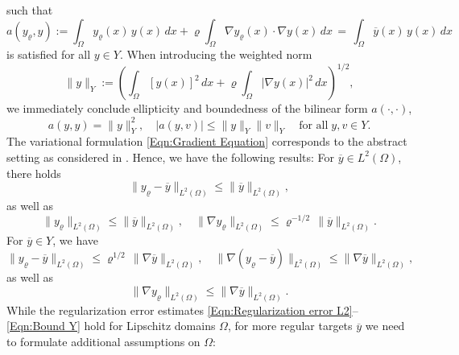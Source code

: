 \documentclass{article}
\numberwithin{equation}{section}
\begin{document}
such that
\begin{equation}\label{Eqn:Gradient Equation}
  a(y_\varrho,y) := \int_\Omega y_\varrho(x) \, y(x) \, dx +
  \varrho \int_\Omega \nabla y_\varrho(x) \cdot \nabla y(x) \, dx
  \, = \,
  \int_\Omega \overline{y}(x) \, y(x) \, dx
\end{equation}
is satisfied for all $y \in Y$. When introducing the weighted norm
\[
  \| y \|_Y := \left( \int_\Omega [y(x)]^2 \, dx + \varrho \int_\Omega 
    |\nabla y(x)|^2 \, dx \right)^{1/2},
\]
we immediately conclude ellipticity and boundedness of the bilinear form
$a(\cdot,\cdot)$,
\begin{equation}\label{Eqn:Properties A}
  a(y,y) = \| y \|^2_Y, \quad
  |a(y,v)| \leq \| y \|_Y \| v \|_Y \quad
  \mbox{for all} \; y,v \in Y .
\end{equation}
The variational formulation \eqref{Eqn:Gradient Equation} corresponds to the
abstract setting as considered in
\cite[Lemma 1]{LangerLoescherSteinbachYang2025arXiv2505.19062}.
Hence, we have the following results: 
For $\overline{y} \in L^2(\Omega)$, there holds
\begin{equation}\label{Eqn:Regularization error L2}
  \| y_\varrho - \overline{y} \|_{L^2(\Omega)} \leq
  \| \overline{y} \|_{L^2(\Omega)}, 
\end{equation}
as well as
\begin{equation}\label{Eqn:Bound L2}
  \| y_\varrho \|_{L^2(\Omega)} \leq
  \| \overline{y} \|_{L^2(\Omega)}, \quad
  \| \nabla y_\varrho \|_{L^2(\Omega)} \leq \varrho^{-1/2} \,
  \| \overline{y} \|_{L^2(\Omega)} .
\end{equation}
For $\overline{y} \in Y$, we have
\begin{equation}\label{Eqn:Regularization error Y}
  \| y_\varrho - \overline{y} \|_{L^2(\Omega)} \leq
  \varrho^{1/2} \, \| \nabla \overline{y} \|_{L^2(\Omega)}, \quad
  \| \nabla (y_\varrho - \overline{y}) \|_{L^2(\Omega)} \leq
  \| \nabla \overline{y} \|_{L^2(\Omega)}, 
\end{equation}
as well as
\begin{equation}\label{Eqn:Bound Y}
  \| \nabla y_\varrho \|_{L^2(\Omega)} \leq
  \| \nabla \overline{y} \|_{L^2(\Omega)} .
\end{equation}
While the regularization error estimates
\eqref{Eqn:Regularization error L2}--\eqref{Eqn:Bound Y} hold for
Lipschitz domains $\Omega$, for more regular targets
$\overline{y}$ we need to formulate additional assumptions on $\Omega$:
\end{document}
